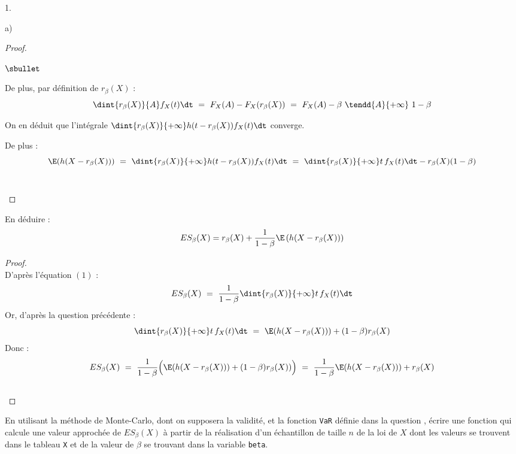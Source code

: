 \begin{noliste}{1.}
\begin{noliste}{a)}
\begin{proof}
\begin{noliste}{$\sbullet$}
	\item De plus, par définition de $r_\beta(X)$ :
	\[
	  \dint{r_\beta(X)}{A} f_X(t) \dt \ = \ F_X(A) - F_X(r_\beta(X))
	  \ = \ F_X(A) - \beta \ \tendd{A}{+\infty} \ 1-\beta
	\]
	
	\item On en déduit que l'intégrale $\dint{r_\beta(X)}{+\infty}
	h(t-r_\beta(X)) f_X(t) \dt$ converge.
	
	De plus :
	\[
	  \E(h(X-r_\beta(X))) \ = \
	  \dint{r_\beta(X)}{+\infty} h(t- r_\beta(X)) f_X(t) \dt 
	  \ = \ \dint{r_\beta(X)}{+\infty} t \, f_X(t) \dt - 
	  r_\beta(X) (1-\beta)
	\]
	~\\[-1.4cm]
      \end{noliste}
    \end{proof}

    
    \item En déduire : 
    \[
      ES_\beta(X)=r_\beta(X)+\dfrac{1}{1-\beta} 
      \E\left(h(X-r_\beta(X))\right)
    \]
    
    \begin{proof}~\\
      D'après l'équation $(1)$ :
      \[
        ES_\beta(X) \ = \ \dfrac{1}{1-\beta} \dint{r_\beta(X)}{+\infty}
        t \, f_X(t) \dt
      \]
      Or, d'après la question précédente :
      \[
        \dint{r_\beta(X)}{+\infty} t \, f_X(t) \dt \ = \ 
        \E(h(X- r_\beta(X))) + (1-\beta) r_\beta(X)
      \]
      Donc : 
      \[
        ES_\beta(X) \ = \ \dfrac{1}{1-\beta} \Big(
        \E(h(X- r_\beta(X))) + (1-\beta) r_\beta(X)) \Big) \ = \
        \dfrac{1}{1-\beta} \E(h(X- r_\beta(X))) + r_\beta(X)
      \]
      \conc{$ES_\beta(X) \ = \ r_\beta(X) + \dfrac{1}{1-\beta} 
      \E(h(X- r_\beta(X)))$}~\\[-1cm]
    \end{proof}
  \end{noliste}
  
  
  
  \newpage
  
  
  
  \item En utilisant la méthode de Monte-Carlo, dont on supposera 
  la validité, et la fonction {\tt VaR} définie dans la question 
  , écrire une fonction \Scilab{} qui calcule une valeur 
  approchée de $ES_\beta(X)$ à partir de la réalisation d'un 
  échantillon de taille $n$ de la loi de $X$ dont les valeurs se 
  trouvent dans le tableau \Scilab{} {\tt X} et de la valeur de 
  $\beta$ se trouvant dans la variable \Scilab{} {\tt beta}.
  

\end{noliste}
